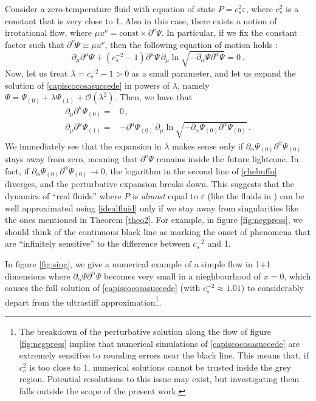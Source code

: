 \documentclass[a4paper, amsfonts, amssymb, amsmath, reprint, showkeys, nofootinbib, twoside,notitlepage,onecolumn]{revtex4-2}
\theoremstyle{definition}
\theoremstyle{theorem}
\theoremstyle{corollary}
\begin{document}
Consider a zero-temperature fluid with equation of state $P=c_s^2 \varepsilon$, where $c_s^2$ is a constant that is very close to 1. Also in this case, there exists a notion of irrotational flow, where $\mu u^\nu = \text{const} \times \partial^\nu \Psi$. In particular, if we fix the constant factor such that $ \partial^\nu \Psi \equiv \mu u^\nu$, then the following equation of motion holds \cite[\S 3.7.4]{rezzolla_book}:
\begin{equation}\label{capiscocosasuccede}
\partial_\mu \partial^\mu \Psi +(c_s^{-2}{-}1) \partial^\mu \Psi \, \partial_\mu \ln\sqrt{- \partial_\alpha \Psi \partial^\alpha \Psi} =0 \, .
\end{equation}
Now, let us treat $\lambda=c_s^{-2}-1>0$ as a small parameter, and let us expand the solution of \eqref{capiscocosasuccede} in powers of $\lambda$, namely $\Psi=\Psi_{(0)}+\lambda \Psi_{(1)}+\mathcal{O}(\lambda^2)$. Then, we have that
\begin{equation}\label{chebuffo}
\begin{split}
\partial_\mu \partial^\mu \Psi_{(0)} ={}& 0 \, , \\
\partial_\mu \partial^\mu \Psi_{(1)} ={}& - \partial^\mu \Psi_{(0)} \, \partial_\mu \ln\sqrt{- \partial_\alpha \Psi_{(0)} \partial^\alpha \Psi_{(0)}}  \, .
\end{split}
\end{equation}
We immediately see that the expansion in $\lambda$ makes sense only if $\partial_\alpha \Psi_{(0)} \partial^\alpha \Psi_{(0)}$ stays away from zero, meaning that $\partial^\nu \Psi$ remains inside the future lightcone. In fact, if $\partial_\alpha \Psi_{(0)} \partial^\alpha \Psi_{(0)}\rightarrow 0$, the logarithm in the second line of \eqref{chebuffo} diverges, and the perturbative expansion breaks down. This suggests that the dynamics of ``real fluids'' where $P$ is \textit{almost} equal to $\varepsilon$ (like the fluids in \cite{Zeldovich:1961sbr,MooreSpeedofSound2024gmt}) can be well approximated using \eqref{idealfluid} only if we stay away from singularities like the ones mentioned in Theorem \ref{theo2}. For example, in figure \ref{fig:negpress}, we should think of the continuous black line as marking the onset of phenomena that are ``infinitely sensitive'' to the difference between $c_s^{-2}$ and 1. 

In figure \ref{fig:sing}, we give a numerical example of a simple flow in 1+1 dimensions where $\partial_\alpha \Psi \partial^\alpha \Psi$ becomes very small in a nieghbourhood of $x=0$, which causes the full solution of \eqref{capiscocosasuccede} (with $c_s^{-2} \approx 1.01$) to considerably depart from the ultrastiff approximation\footnote{The breakdown of the perturbative solution along the flow of figure \ref{fig:negpress} implies that numerical simulations of \eqref{capiscocosasuccede} are extremely sensitive to rounding errors near the black line. This means that, if $c_s^2$ is too close to 1, numerical solutions cannot be trusted inside the grey region. Potential resolutions to this issue may exist, but investigating them falls outside the scope of the present work.}.
\end{document}
